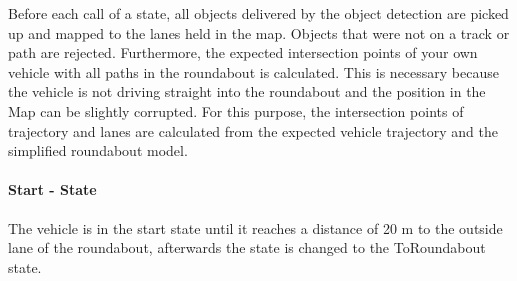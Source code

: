 \documentclass[11pt,oneside,openright]{mpreport}
\begin{document}

Before each call of a state, all objects delivered by the object detection are picked up and mapped to the lanes held in the map.
Objects that were not on a track or path are rejected.
Furthermore, the expected intersection points of your own vehicle with all paths in the roundabout is calculated. 
This is necessary because the vehicle is not driving straight into the roundabout and the position in the Map can be slightly corrupted. For this purpose,
the intersection points of trajectory and lanes are calculated from the expected vehicle trajectory and the simplified roundabout model.

\paragraph{Start - State}
The vehicle is in the start state until it reaches a distance of 20 m to the outside lane of the roundabout, afterwards the state is changed to the ToRoundabout state.
\end{document}
